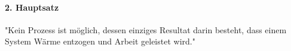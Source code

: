 


\paragraph{2. Hauptsatz}
"Kein Prozess ist möglich, dessen einziges Resultat darin besteht, dass einem
System Wärme entzogen und Arbeit geleistet wird."
